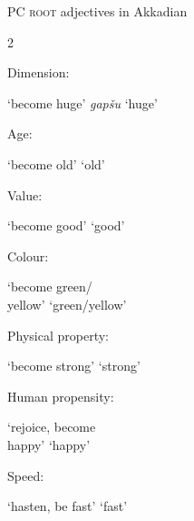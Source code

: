 \documentclass[output=paper,colorlinks,citecolor=brown]{langscibook}
\begin{document}
\newpage
\begin{exe}  \ex PC \textsc{root} adjectives in Akkadian\label{ex:PCroots_examples}
\begin{multicols}{2}
\begin{xlist}
    \ex Dimension: 
    \begin{xlist}
        \ex {} `become huge'
        \ex \textit{gapšu} `huge' 
    \end{xlist}
   \ex Age: 
   \begin{xlist}
       \ex      {} `become old'
       \ex  {} `old'
   \end{xlist}
\ex Value: 
\begin{xlist} \ex {} `become good'
\ex  {} `good'
\end{xlist}
\ex  Colour:  
\begin{xlist}
        \ex {} `become green/\\yellow'
       \ex {} `green/yellow'
\end{xlist}
\ex  Physical property: 
\begin{xlist}
          \ex {} `become strong'
       \ex {} `strong'
\end{xlist}
\ex Human propensity: 
\begin{xlist}
    \ex     {} `rejoice, become\\ happy'
        \ex {} `happy'
\end{xlist}
\ex  Speed: 
\begin{xlist}
    \ex     {} `hasten, be fast'
    \ex  {} `fast'    
\end{xlist}
\end{xlist}
\end{multicols}
\end{exe} 
\end{document}
